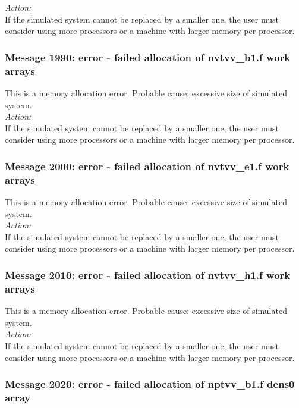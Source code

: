 \noindent
{\em Action:}\\
If the simulated system cannot be replaced by a smaller one, the user
must consider using more processors or a machine with larger memory
per processor.

\subsubsection*{Message 1990: error - failed allocation of nvtvv\_b1.f
work arrays}

This is a memory allocation error. Probable cause: excessive size of
simulated system. \\

\noindent
{\em Action:}\\
If the simulated system cannot be replaced by a smaller one, the user
must consider using more processors or a machine with larger memory
per processor.

\subsubsection*{Message 2000: error - failed allocation of nvtvv\_e1.f
work arrays}

This is a memory allocation error. Probable cause: excessive size of
simulated system. \\

\noindent
{\em Action:}\\
If the simulated system cannot be replaced by a smaller one, the user
must consider using more processors or a machine with larger memory
per processor.

\subsubsection*{Message 2010: error - failed allocation of nvtvv\_h1.f
work arrays}

This is a memory allocation error. Probable cause: excessive size of
simulated system. \\

\noindent
{\em Action:}\\
If the simulated system cannot be replaced by a smaller one, the user
must consider using more processors or a machine with larger memory
per processor.

\subsubsection*{Message 2020: error - failed allocation of nptvv\_b1.f
dens0 array}

